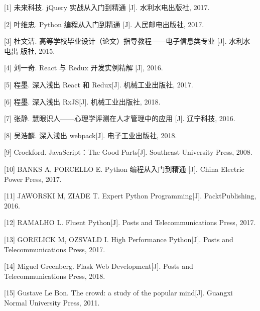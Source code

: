 
[1] 未来科技. jQuery 实战从入门到精通 [J]. 水利水电出版社, 2017. 

[2] 叶维忠. Python 编程从入门到精通 [J]. 人民邮电出版社, 2017. 

[3] 杜文洁. 高等学校毕业设计（论文）指导教程——电子信息类专业 [J]. 水利水电出 版社, 2015. 

[4] 刘一奇. React 与 Redux 开发实例精解 [J], 2016. 

[5] 程墨. 深入浅出 React 和 Redux[J]. 机械工业出版社, 2017. 

[6] 程墨. 深入浅出 RxJS[J]. 机械工业出版社, 2018. 

[7] 张静. 慧眼识人——心理学评测在人才管理中的应用 [J]. 辽宁科技, 2016.

[8] 吴浩麟. 深入浅出 webpack[J]. 电子工业出版社, 2018. 

[9] Crockford. JavaScript：The Good Parts[J]. Southeast University Press, 2008. 
	
[10] BANKS A, PORCELLO E. Python 编程从入门到精通 [J]. China Electric Power Press, 2017. 
	
[11] JAWORSKI M, ZIADE T. Expert Python Programming[J]. PacktPublishing, 2016. 
	
[12] RAMALHO L. Fluent Python[J]. Posts and Telecommunications Press, 2017. 
	
[13] GORELICK M, OZSVALD I. High Performance Python[J]. Posts and Telecommunications Press, 2017. 
	
[14] Miguel Greenberg. Flask Web Development[J]. Posts and Telecommunications Press, 2018. 
	
[15] Gustave Le Bon. The crowd: a study of the popular mind[J]. Guangxi Normal University Press, 2011.